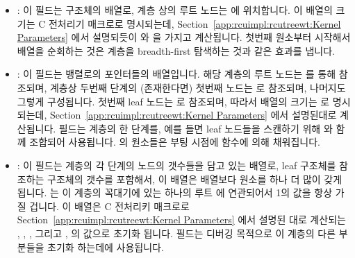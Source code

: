 \begin{itemize}
\item	{}:
	이 필드는  구조체의 배열로, 계층 상의 루트 노드는
	 에 위치합니다.
	이 배열의 크기는  C 전처리기 매크로로 명시되는데,
	Section~\ref{app:rcuimpl:rcutreewt:Kernel Parameters} 에서 설명되듯이
	 와  을 가지고 계산됩니다.
	첫번째 원소부터 시작해서  배열을 순회하는 것은 
	계층을 breadth-first 탐색하는 것과 같은 효과를 냅니다.
	\iffalse

	This field is the array of \co{rcu_node} structures,
	with the root node of the hierarchy being located at
	\co{->node[0]}.
	The size of this array is specified by the
	\co{NUM_RCU_NODES} C-preprocessor macro, which is computed
	from \co{NR_CPUS} and \co{CONFIG_RCU_FANOUT}
	as described in
	Section~\ref{app:rcuimpl:rcutreewt:Kernel Parameters}.
	Note that traversing the \co{->node} array starting at
	element zero has the effect of doing a breadth-first search
	of the \co{rcu_node} hierarchy.
	\fi
\item	{}:
	이 필드는  뱅렬로의 포인터들의 배열입니다.
	해당 계층의 루트 노드는  를 통해 참조되며, 계층상 두번째
	단계의 (존재한다면) 첫번째 노드는  로 참조되며, 나머지도
	그렇게 구성됩니다.
	첫번째 leaf 노드는  로 참조되며, 따라서
	 배열의 크기는  로 명시되는데,
	Section~\ref{app:rcuimpl:rcutreewt:Kernel Parameters} 에서 설명된대로
	계산됩니다.
	 필드는  계층의 한 단계를, 예를 들면 leaf
	노드들을 스캔하기 위해  와 함께 조합되어 사용됩니다.
	 의 원소들은 부팅 시점에  함수에 의해
	채워집니다.
	\iffalse

	This field is an array of pointers into the \co{node} array.
	The root node of the hierarchy is referenced by
	\co{->level[0]}, the first node of the second level of
	the hierarchy (if there is one) by \co{->level[1]}, and so on.
	The first leaf node is referenced by
	\co{->level[NUM_RCU_LVLS-1]}, and the size of the \co{level}
	array is thus specified by \co{NUM_RCU_LVLS}, which is
	computed as described in
	Section~\ref{app:rcuimpl:rcutreewt:Kernel Parameters}.
	The \co{->level} field is often used in combination with
	\co{->node} to scan a level of the \co{rcu_node} hierarchy,
	for example, all of the leaf nodes.
	The elements of \co{->level} are filled in by the
	boot-time \co{rcu_init_one()} function.
	\fi
\item	{}:
	이 필드는  계층의 각 단계의 노드의 갯수들을 담고 있는
	배열로, leaf  구조체를 참조하는  구조체의
	갯수를 포함해서, 이 배열은  배열보다 원소를 하나 더 많이
	갖게 됩니다.
	 는 이 계층의 꼭대기에 있는 하나의 루트 
	에 연관되어서 1의 값을 항상 가질 겁니다.
	이 배열은 C 전처리키 매크로로
	Section~\ref{app:rcuimpl:rcutreewt:Kernel Parameters} 에서 설명된 대로
	계산되는
	,
	,
	, 그리고
	,
	의 값으로 초기화 됩니다.
	 필드는 디버깅 목적으로 이 계층의 다른 부분들을 초기화
	하는데에 사용됩니다.
	\iffalse


\end{itemize}
